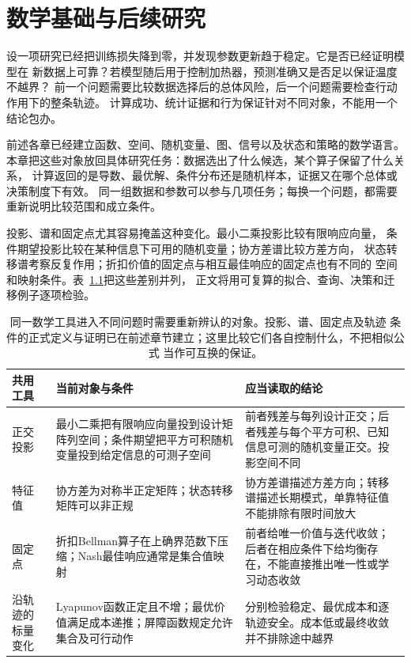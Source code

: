 \chapter{数学基础与后续研究}
\label{chap:mathematics-and-future-research}

设一项研究已经把训练损失降到零，并发现参数更新趋于稳定。它是否已经证明模型在
新数据上可靠？若模型随后用于控制加热器，预测准确又是否足以保证温度不越界？
前一个问题需要比较数据选择后的总体风险，后一个问题需要检查行动作用下的整条轨迹。
计算成功、统计证据和行为保证针对不同对象，不能用一个结论包办。

前述各章已经建立函数、空间、随机变量、图、信号以及状态和策略的数学语言。
本章把这些对象放回具体研究任务：数据选出了什么候选，某个算子保留了什么关系，
计算返回的是导数、最优解、条件分布还是随机样本，证据又在哪个总体或决策制度下有效。
同一组数据和参数可以参与几项任务；每换一个问题，都需要重新说明比较范围和成立条件。

投影、谱和固定点尤其容易掩盖这种变化。最小二乘投影比较有限响应向量，
条件期望投影比较在某种信息下可用的随机变量；协方差谱比较方差方向，
状态转移谱考察反复作用；折扣价值的固定点与相互最佳响应的固定点也有不同的
空间和映射条件。表~\ref{tab:future-reused-mathematical-objects}把这些差别并列，
正文将用可复算的拟合、查询、决策和迁移例子逐项检验。

\begin{table}[htbp]
  \centering
  \begin{tabularx}{\linewidth}{lXX}
    \toprule
    共用工具 & 当前对象与条件 & 应当读取的结论\\
    \midrule
    正交投影 & 最小二乘把有限响应向量投到设计矩阵列空间；条件期望把平方可积随机变量投到给定信息的可测子空间 & 前者残差与每列设计正交；后者残差与每个平方可积、已知信息可测的随机变量正交。投影空间不同\\
    特征值 & 协方差为对称半正定矩阵；状态转移矩阵可以非正规 & 协方差谱描述方差方向；转移谱描述长期模式，单靠特征值不能排除有限时间放大\\
    固定点 & 折扣Bellman算子在上确界范数下压缩；Nash最佳响应通常是集合值映射 & 前者给唯一价值与迭代收敛；后者在相应条件下给均衡存在，不能直接推出唯一性或学习动态收敛\\
    沿轨迹的标量变化 & Lyapunov函数正定且不增；最优价值满足成本递推；屏障函数规定允许集合及可行动作 & 分别检验稳定、最优成本和逐轨迹安全。成本低或最终收敛并不排除途中越界\\
    \bottomrule
  \end{tabularx}
  \caption{同一数学工具进入不同问题时需要重新辨认的对象。投影、谱、固定点及轨迹
  条件的正式定义与证明已在前述章节建立；这里比较它们各自控制什么，不把相似公式
  当作可互换的保证。}
  \label{tab:future-reused-mathematical-objects}
\end{table}

